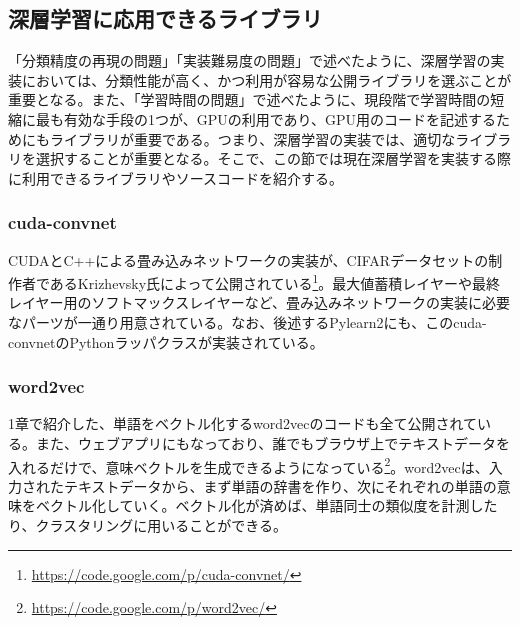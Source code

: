 \subsection{深層学習に応用できるライブラリ}
「分類精度の再現の問題」「実装難易度の問題」で述べたように、深層学習の実装においては、分類性能が高く、かつ利用が容易な公開ライブラリを選ぶことが重要となる。また、「学習時間の問題」で述べたように、現段階で学習時間の短縮に最も有効な手段の1つが、GPUの利用であり、GPU用のコードを記述するためにもライブラリが重要である。つまり、深層学習の実装では、適切なライブラリを選択することが重要となる。そこで、この節では現在深層学習を実装する際に利用できるライブラリやソースコードを紹介する。

\subsubsection{cuda-convnet}
CUDAとC++による畳み込みネットワークの実装が、CIFARデータセットの制作者であるKrizhevsky氏によって公開されている\footnote{\url{https://code.google.com/p/cuda-convnet/}}。最大値蓄積レイヤーや最終レイヤー用のソフトマックスレイヤーなど、畳み込みネットワークの実装に必要なパーツが一通り用意されている。なお、後述するPylearn2にも、このcuda-convnetのPythonラッパクラスが実装されている。

\subsubsection{word2vec}
1章で紹介した、単語をベクトル化するword2vecのコードも全て公開されている。また、ウェブアプリにもなっており、誰でもブラウザ上でテキストデータを入れるだけで、意味ベクトルを生成できるようになっている\footnote{\url{https://code.google.com/p/word2vec/}}。word2vecは、入力されたテキストデータから、まず単語の辞書を作り、次にそれぞれの単語の意味をベクトル化していく。ベクトル化が済めば、単語同士の類似度を計測したり、クラスタリングに用いることができる。


